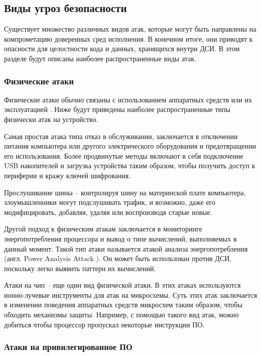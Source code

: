 \subsection{Виды угроз безопасности}
\label{sec:security}

Существует множество различных видов атак, которые могут быть направлены на компрометацию доверенных сред исполнения. В конечном итоге, они приводят к опасности для целостности кода и данных, хранящихся внутри ДСИ. В этом разделе будут описаны наиболее распространенные виды атак.

\subsubsection{Физические атаки}

Физические атаки обычно связаны с использованием аппаратных средств или их эксплуатацией \cite{attack-on-chip}. Ниже будут приведены наиболее распространенные типы физически атак на устройство.

Самая простая атака типа отказ в обслуживании, заключается в отключении питания компьютера или другого электрического оборудования и предотвращении его использования. Более продвинутые методы включают в себя подключение USB накопителей и загрузка устройства таким образом, чтобы получить доступ к периферии и кражу ключей шифрования.

Прослушивание шины \cite{attack-on-chip} -- контролируя шину на материнской плате компьютера, злоумышленники могут подслушивать трафик, и возможно, даже его модифицировать, добавляя, удаляя или воспроизводя старые новые.

Другой подход к физическим атакам заключается в мониторинге энергопотребления процессора и вывод о типе вычислений, выполняемых в данный момент. Такой тип атаки называется атакой анализа энергопотребления (англ. Power Analysis Attack \cite{power-analysis-attack}). Он может быть использован против ДСИ, поскольку легко выявить паттерн их вычислений.

Атаки на чип \cite{attack-on-chip} -- еще один вид физической атаки. В этих атаках используются ионно-лучевые инструменты для атак на микросхемы. Суть этих атак заключается в изменении поведения аппаратных средств микросхем таким образом, чтобы обходить механизмы защиты. Например, с помощью такого вид атак, можно добиться чтобы процессор пропускал некоторые инструкции ПО.

\subsubsection{Атаки на привилегированное ПО}

